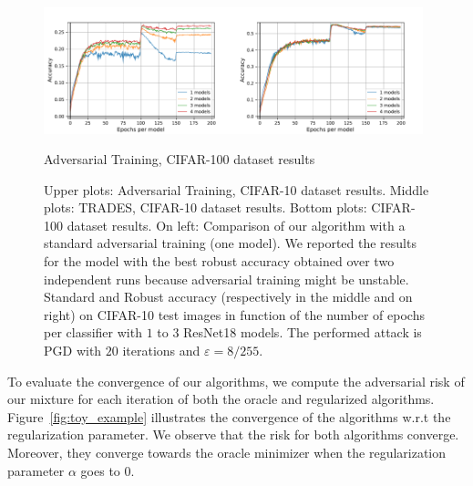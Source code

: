 \begin{figure}[!ht]
\begin{center}
\begin{minipage}[ht!]{0.39\textwidth}
\begin{scriptsize}
\begin{tabular}{c|c|ccc}
\end{tabular}
\end{scriptsize}
  \end{minipage}\begin{minipage}[!ht]{0.61\textwidth}
\includegraphics[width=0.49\textwidth]{Images/robust_acc_CIFAR100_finalrun_ResNet18_1024_200_0.001.pdf}\includegraphics[width=0.49\textwidth]{Images/standard_acc_CIFAR100_finalrun_ResNet18_1024_200_0.001.pdf} 
  \end{minipage}
  Adversarial Training, CIFAR-100 dataset results

 \caption{Upper plots: Adversarial Training, CIFAR-10 dataset results. Middle plots:  TRADES, CIFAR-10 dataset results. Bottom plots: CIFAR-100 dataset results. {On left}: Comparison of our algorithm with a standard adversarial training (one model). We reported the results for the model with the best robust accuracy obtained over two independent runs because adversarial training might be unstable. Standard and Robust accuracy (respectively in the middle and on right) on CIFAR-10 test images in function of the number of epochs per classifier with $1$ to $3$ ResNet18 models. The performed attack is PGD with $20$ iterations and $\varepsilon=8/255$.}
\label{fig:results_cifar}

\end{center}
\end{figure}

To evaluate the convergence of our algorithms, we compute the adversarial risk of our mixture for each iteration of both the oracle and regularized algorithms. Figure~\ref{fig:toy_example} illustrates the convergence of the algorithms w.r.t the regularization parameter. We observe that the risk for both algorithms converge. Moreover, they converge towards the oracle minimizer when the regularization parameter $\alpha$ goes to $0$.

